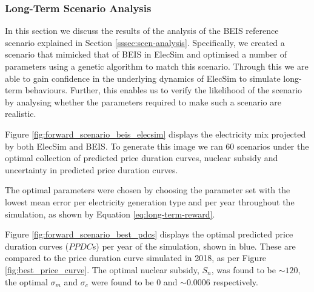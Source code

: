 





\subsubsection{Long-Term Scenario Analysis}

In this section we discuss the results of the analysis of the BEIS reference scenario explained in Section \ref{sssec:scen-analysis}. Specifically, we created a scenario that mimicked that of BEIS in ElecSim and optimised a number of parameters using a genetic algorithm to match this scenario. Through this we are able to gain confidence in the underlying dynamics of ElecSim to simulate long-term behaviours. Further, this enables us to verify the likelihood of the scenario by analysing whether the parameters required to make such a scenario are realistic.

Figure \ref{fig:forward_scenario_beis_elecsim} displays the electricity mix projected by both ElecSim and BEIS. To generate this image we ran 60 scenarios under the optimal collection of predicted price duration curves, nuclear subsidy and uncertainty in predicted price duration curves. 

The optimal parameters were chosen by choosing the parameter set with the lowest mean error per electricity generation type and per year throughout the simulation, as shown by Equation \ref{eq:long-term-reward}.


Figure \ref{fig:forward_scenario_best_pdcs} displays the optimal predicted price duration curves ($PPDC$s) per year of the simulation, shown in blue. These are compared to the price duration curve simulated in 2018, as per Figure \ref{fig:best_price_curve}. The optimal nuclear subsidy, $S_n$, was found to be ${\sim}$\textsterling $120$, the optimal $\sigma_m$ and $\sigma_c$ were found to be $0$ and ${\sim}0.0006$ respectively.

